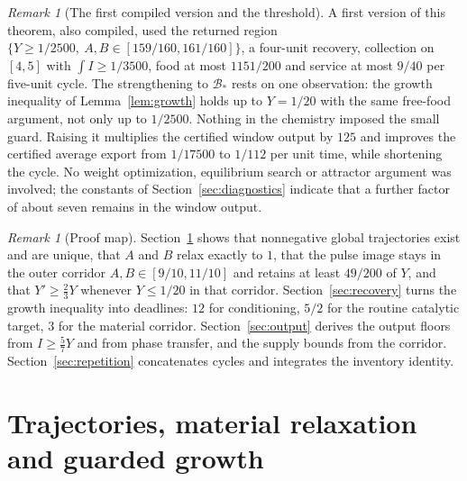\documentclass[11pt,a4paper]{article}
\theoremstyle{plain}
\theoremstyle{definition}
\theoremstyle{remark}
\newtheorem{remark}[theorem]{Remark}
\newcommand{\Bstar}{\mathcal B_*}
\newcommand{\Iv}{I}
\begin{document}
\begin{remark}[The first compiled version and the threshold]\label{rem:first}
A first version of this theorem, also compiled, used the returned region $\{Y\ge1/2500,\ A,B\in[159/160,161/160]\}$, a four-unit recovery, collection on $[4,5]$ with $\int\Iv\ge1/3500$, food at most $1151/200$ and service at most $9/40$ per five-unit cycle. The strengthening to $\Bstar$ rests on one observation: the growth inequality of Lemma~\ref{lem:growth} holds up to $Y=1/20$ with the same free-food argument, not only up to $1/2500$. Nothing in the chemistry imposed the small guard. Raising it multiplies the certified window output by $125$ and improves the certified average export from $1/17500$ to $1/112$ per unit time, while shortening the cycle. No weight optimization, equilibrium search or attractor argument was involved; the constants of Section~\ref{sec:diagnostics} indicate that a further factor of about seven remains in the window output.
\end{remark}

\begin{remark}[Proof map]
Section~\ref{sec:trajectories} shows that nonnegative global trajectories exist and are unique, that $A$ and $B$ relax exactly to $1$, that the pulse image stays in the outer corridor $A,B\in[9/10,11/10]$ and retains at least $49/200$ of $Y$, and that $Y'\ge\tfrac23Y$ whenever $Y\le1/20$ in that corridor. Section~\ref{sec:recovery} turns the growth inequality into deadlines: $12$ for conditioning, $5/2$ for the routine catalytic target, $3$ for the material corridor. Section~\ref{sec:output} derives the output floors from $\Iv\ge\tfrac57Y$ and from phase transfer, and the supply bounds from the corridor. Section~\ref{sec:repetition} concatenates cycles and integrates the inventory identity.
\end{remark}

\section{Trajectories, material relaxation and guarded growth}\label{sec:trajectories}
\end{document}
